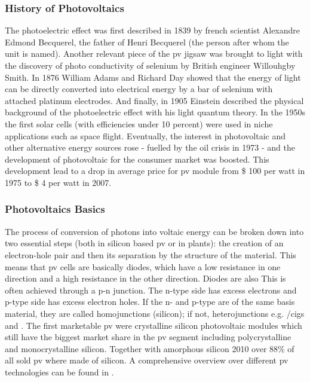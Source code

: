 \subsubsection{History of Photovoltaics}
The photoelectric effect was first described in 1839 by french scientist Alexandre 
Edmond Becquerel\cite{becquerel1839memoire}, the father of Henri Becquerel (the person after whom the unit is named).
Another relevant piece of the \gls{pv} jigsaw was brought to light
with the discovery of photo conductivity of selenium
by British engineer Willouhgby Smith\cite{Smith1873Selenium}.
In 1876 William Adams and Richard Day\cite{Adams1876Selenium} showed that 
the energy of light can be directly converted into electrical energy by a bar of 
selenium with attached platinum electrodes.
And finally, in 1905 Einstein described the physical background of the photoelectric 
effect with his light quantum theory\cite{einstein1905erzeugung}.
In the 1950s the first solar cells (with efficiencies under 10 percent) were used in niche applications such as space flight. 
Eventually, the interest in photovoltaic and other alternative energy sources 
rose - fuelled by the oil crisis in 1973 - 
and the development of photovoltaic for the consumer market was boosted. 
This development lead to a drop in 
average price for \gls{pv} module from \$ 100 per watt in 1975 to \$ 4 per watt in 2007\cite{pagliaro2008flexible}.

\subsubsection{Photovoltaics Basics}
The process of conversion of photons into voltaic energy can be broken down into two essential steps (both in silicon based \gls{pv} or in plants): 
the creation of an electron-hole pair and then its separation by the structure of the material.\cite{markvart2013principles}
This means that \gls{pv} cells are basically diodes, which have a low resistance in one direction and a high resistance in the other direction. Diodes are also 
This is often achieved through a p-n junction.
The n-type side has excess electrons and p-type side has excess electron holes. 
If the n- and p-type are of the same basis material, they are called homojunctions (silicon); if not, heterojunctions e.g. /\gls{cigs} and .\cite{breitenstein2013understanding}
%
The first marketable \gls{pv} were crystalline silicon photovoltaic modules which still have the biggest market share in the \gls{pv} segment including polycrystalline and monocrystalline silicon.
Together with amorphous silicon 2010 over 88\% of all sold \gls{pv} where made of silicon\cite{breitenstein2013understanding}.
A comprehensive overview over different \gls{pv} technologies can be found in \cite{markvart2013principles}.


